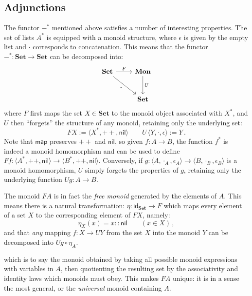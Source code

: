 \documentclass[draft,11pt]{report}
\theoremstyle{definition}
\newcommand{\kw}[1]{\ensuremath{ \mathsf{#1} }}
\begin{document}

\subsection{Adjunctions} %

The functor ${-}^*$ mentioned above
satisfies a number of interesting properties.
The set of lists $A^*$ is equipped with a monoid structure,
where $\epsilon$ is given by the empty list and
$\cdot$ corresponds to concatenation.
This means that the functor
${-}^* : \mathbf{Set} \rightarrow \mathbf{Set}$
can be decomposed into:
\[
  \begin{tikzcd}[row sep=large]
    \mathbf{Set} \ar[r, "F"] \ar [dr, "-^*"'] &
    \mathbf{Mon} \ar[d, "U"] \\ &
    \mathbf{Set}
  \end{tikzcd}
\]
where $F$ first maps
the set $X \in \mathbf{Set}$ to
the monoid object associated with $X^*$,
and $U$ then ``forgets'' the structure of any monoid,
retaining only the underlying set:
\[
  F X := \langle X^*, {+\!+}, \kw{nil} \rangle
  \qquad
  U \, \langle Y, {\cdot}, \epsilon \rangle := Y
  \,.
\]
Note that $\kw{map}$ preserves ${+\!+}$ and $\kw{nil}$,
so given $f : A \rightarrow B$,
the function $f^*$ is indeed a monoid homomorphism
and can be used to define
$F f :
 \langle A^*, +\!+, \kw{nil} \rangle \rightarrow
 \langle B^*, +\!+, \kw{nil} \rangle$.
Conversely,
if $g : \langle A, \cdot_A, \epsilon_A \rangle \rightarrow
        \langle B, \cdot_B, \epsilon_B \rangle$
is a monoid homomorphism,
$U$ simply forgets the properties of $g$,
retaining only the underlying function
$U g : A \rightarrow B$.

The monoid $F A$ is in fact the \emph{free monoid}
generated by the elements of $A$.
This means there is a natural transformation:
$
  \eta : \kw{id}_\mathbf{Set} \rightarrow F
$
which maps every element of a set $X$
to the corresponding element of $F X$,
namely:
\[
  \eta_X(x) = x :: \kw{nil} \qquad (x \in X) \,,
\]
and that \emph{any}
mapping $f : X \rightarrow U Y$
from the set $X$ into the monoid $Y$
can be decomposed into
$U g \circ \eta_A$.



which is to say the monoid obtained by
taking all possible monoid expressions with variables in $A$,
then quotienting the resulting set
by the associativity and identity laws which monoids must obey.
This makes $F A$ unique:
it is in a sense the most general,
or the \emph{universal} monoid
containing $A$.
\end{document}
